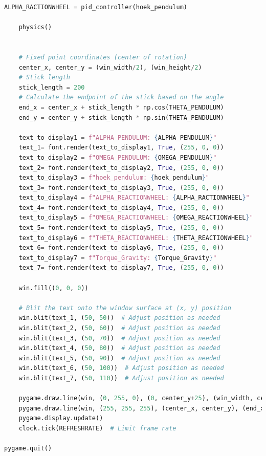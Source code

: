 \documentclass{article}
\begin{document}
\begin{lstlisting}[language=Python, caption=Python simulation]
    ALPHA_RACTIONWHEEL = pid_controller(hoek_pendulum)

    physics()


    # Fixed point coordinates (center of rotation)
    center_x, center_y = (win_width/2), (win_height/2)
    # Stick length
    stick_length = 200
    # Calculate the endpoint of the stick based on the angle
    end_x = center_x + stick_length * np.cos(THETA_PENDULUM)
    end_y = center_y + stick_length * np.sin(THETA_PENDULUM)
    
    text_to_display1 = f"ALPHA_PENDULUM: {ALPHA_PENDULUM}"
    text_1= font.render(text_to_display1, True, (255, 0, 0))
    text_to_display2 = f"OMEGA_PENDULUM: {OMEGA_PENDULUM}"
    text_2= font.render(text_to_display2, True, (255, 0, 0))
    text_to_display3 = f"hoek_pendulum: {hoek_pendulum}"
    text_3= font.render(text_to_display3, True, (255, 0, 0))
    text_to_display4 = f"ALPHA_REACTIONWHEEL: {ALPHA_RACTIONWHEEL}"
    text_4= font.render(text_to_display4, True, (255, 0, 0))
    text_to_display5 = f"OMEGA_REACTIONWHEEL: {OMEGA_REACTIONWHEEL}"
    text_5= font.render(text_to_display5, True, (255, 0, 0))
    text_to_display6 = f"THETA_REACTIONWHEEL: {THETA_REACTIONWHEEL}"
    text_6= font.render(text_to_display6, True, (255, 0, 0))
    text_to_display7 = f"Torque_Gravity: {Torque_Gravity}"
    text_7= font.render(text_to_display7, True, (255, 0, 0))

    win.fill((0, 0, 0))

    # Blit the text onto the window surface at (x, y) position
    win.blit(text_1, (50, 50))  # Adjust position as needed
    win.blit(text_2, (50, 60))  # Adjust position as needed
    win.blit(text_3, (50, 70))  # Adjust position as needed
    win.blit(text_4, (50, 80))  # Adjust position as needed
    win.blit(text_5, (50, 90))  # Adjust position as needed
    win.blit(text_6, (50, 100))  # Adjust position as needed
    win.blit(text_7, (50, 110))  # Adjust position as needed

    pygame.draw.line(win, (0, 255, 0), (0, center_y+25), (win_width, center_y+25), 50)
    pygame.draw.line(win, (255, 255, 255), (center_x, center_y), (end_x, end_y), 5)
    pygame.display.update()
    clock.tick(REFRESHRATE)  # Limit frame rate 
    
pygame.quit()
\end{lstlisting}
\newpage
\end{document}
